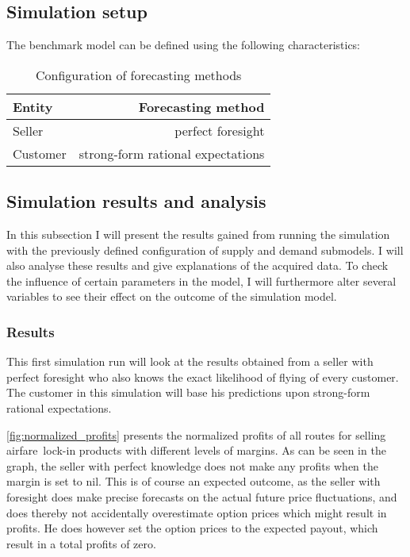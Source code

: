 \subsection{Simulation setup}


The benchmark model can be defined using the following characteristics:

\begin{table}
    \centering
    \begin{tabular}{l  r}
    \toprule
    Entity      &  Forecasting method \\
    \midrule
    Seller    &  perfect foresight  \\
    Customer  &  strong-form rational expectations \\
    \bottomrule
    \end{tabular}
    \caption{Configuration of forecasting methods}
    \label{tbl:ForecastingConfigBenchmark}
\end{table}


\subsection{Simulation results and analysis}
In this subsection I will present the results gained from running the simulation with the previously defined configuration of supply and demand submodels. I will also analyse these results and give explanations of the acquired data. To check the influence of certain parameters in the model, I will furthermore alter several variables to see their effect on the outcome of the simulation model.

\subsubsection{Results}
This first simulation run will look at the results obtained from a seller with perfect foresight who also knows the exact likelihood of flying of every customer. The customer in this simulation will base his predictions upon strong-form rational expectations.

\autoref{fig:normalized_profits} presents the normalized profits of all routes for selling airfare~lock-in products with different levels of margins. As can be seen in the graph, the seller with perfect knowledge does not make any profits when the margin is set to nil. This is of course an expected outcome, as the seller with foresight does make precise forecasts on the actual future price fluctuations, and does thereby not accidentally overestimate option prices which might result in profits. He does however set the option prices to the expected payout, which result in a total profits of zero.

